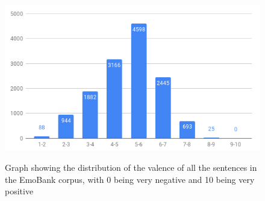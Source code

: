 \begin{figure}[h]
\caption{Graph showing the distribution of the valence of all the sentences in the EmoBank corpus, with 0 being very negative and 10 being very positive}
\centering
\includegraphics[scale=1.9]{./LitReview/images/words-valence-buckets.png}
\label{words:dist}
\end{figure}
